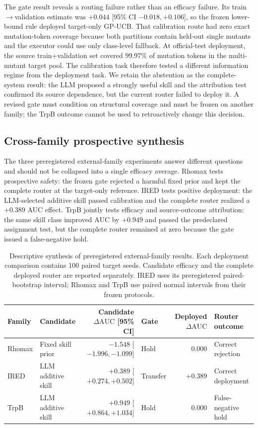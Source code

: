 \documentclass[pdflatex,sn-nature]{sn-jnl}
\newcommand{\dauc}{\Delta\mathrm{AUC}}
\begin{document}
\begin{appendices}
The gate result reveals a routing failure rather than an efficacy failure. Its
train$\rightarrow$validation estimate was $+0.044$ [95\% CI
$-0.018,+0.106$], so the frozen lower-bound rule deployed target-only GP-UCB.
That calibration route had zero exact mutation-token coverage because both
partitions contain held-out single mutants and the executor could use only
class-level fallback. At official-test deployment, the source train+validation
set covered 99.97\% of mutation tokens in the multi-mutant target pool. The
calibration task therefore tested a different information regime from the
deployment task. We retain the abstention as the complete-system result: the
LLM proposed a strongly useful skill and the attribution test confirmed its
source dependence, but the current router failed to deploy it. A revised gate
must condition on structural coverage and must be frozen on another family;
the TrpB outcome cannot be used to retroactively change this decision.

\subsection{Cross-family prospective synthesis}
\label{sec:external_triad}

The three preregistered external-family experiments answer different questions
and should not be collapsed into a single efficacy average. Rhomax tests
prospective safety: the frozen gate rejected a harmful fixed prior and kept the
complete router at the target-only reference. IRED tests positive deployment:
the LLM-selected additive skill passed calibration and the complete router
realized a $+0.389$ AUC effect. TrpB jointly tests efficacy and source-outcome
attribution: the same skill class improved AUC by $+0.949$ and passed the
predeclared assignment test, but the complete router remained at zero because
the gate issued a false-negative hold.

\begin{table}[t]
\centering
\caption{Descriptive synthesis of preregistered external-family results. Each
deployment comparison contains 100 paired target seeds. Candidate efficacy and
the complete deployed router are reported separately. IRED uses its
preregistered paired-bootstrap interval; Rhomax and TrpB use paired normal
intervals from their frozen protocols.}
\label{tab:external_triad}
\scriptsize
\setlength{\tabcolsep}{3.0pt}
\begin{tabularx}{\textwidth}{@{}l X r l r X@{}}
\toprule
Family & Candidate & Candidate $\dauc$ [95\% CI] & Gate & Deployed $\dauc$ & Router outcome \\
\midrule
Rhomax & Fixed skill prior & $-1.548$ [$-1.996,-1.099$] & Hold & $0.000$ & Correct rejection \\
IRED & LLM additive skill & $+0.389$ [$+0.274,+0.502$] & Transfer & $+0.389$ & Correct deployment \\
TrpB & LLM additive skill & $+0.949$ [$+0.864,+1.034$] & Hold & $0.000$ & False-negative hold \\
\bottomrule
\end{tabularx}
\end{table}


\end{appendices}
\end{document}
